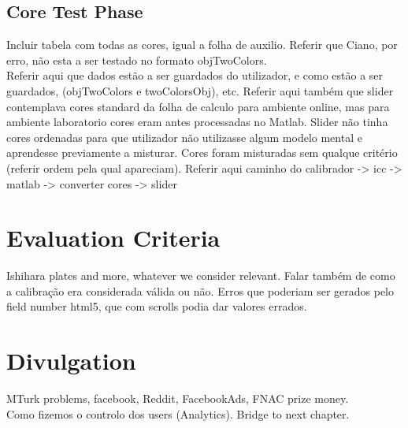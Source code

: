 \subsection{Core Test Phase}
\label{subsec:design_core}
%
Incluir tabela com todas as cores, igual a folha de auxilio. Referir que Ciano, por erro, não esta a ser testado no formato objTwoColors. \\
Referir aqui que dados estão a ser guardados do utilizador, e como estão a ser guardados, (objTwoColors e twoColorsObj), etc.
Referir aqui também que slider contemplava cores standard da folha de calculo para ambiente online,
mas para ambiente laboratorio cores eram antes processadas no Matlab. Slider não tinha cores ordenadas para que utilizador não utilizasse
algum modelo mental e aprendesse previamente a misturar. Cores foram misturadas sem qualque critério (referir ordem pela qual apareciam).
Referir aqui caminho do calibrador -> icc -> matlab -> converter cores -> slider
%
\section{Evaluation Criteria}
\label{sec:impl_evaluationcriteria}
Ishihara plates and more, whatever we consider relevant. Falar também de como a calibração era considerada válida ou não. Erros
que poderiam ser gerados pelo field number html5, que com scrolls podia dar valores errados. \\

\section{Divulgation}
\label{sec:impl_divulgation}
MTurk problems, facebook, Reddit, FacebookAds, FNAC prize money. \\
Como fizemos o controlo dos users (Analytics).
Bridge to next chapter.
